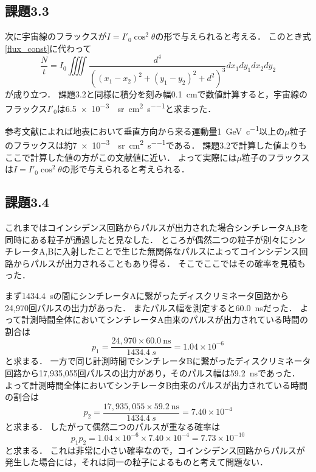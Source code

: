 \documentclass[a4paper,11pt]{jsarticle}
\begin{document}
\subsection{課題3.3}
次に宇宙線のフラックスが$I=I'_0\cos^2{\theta}$の形で与えられると考える．
このとき式\eqref{flux_const}に代わって
\begin{equation}
  \frac{N}{t} = I_0 \iiiint \frac{d^4}{\left((x_1 - x_2)^2 + (y_1 - y_2)^2 + d^2 \right)^{3}} dx_1dy_1dx_2dy_2
\end{equation}
が成り立つ．
課題3.2と同様に積分を刻み幅\SI{0.1}{\cm}で数値計算すると，宇宙線のフラックス$I'_0$は\SI{6.5e-3}{\per\steradian\per\cm^2\per\s}と求まった．

参考文献\cite{cosmray}によれば地表において垂直方向から来る運動量\SI{1}{\GeV \per c}以上の$\mu$粒子のフラックスは約\SI{7e-3}{\per\steradian\per\cm^2\per\s}である．
課題3.2で計算した値よりもここで計算した値の方がこの文献値に近い．
よって実際には$\mu$粒子のフラックスは$I=I'_0\cos^2{\theta}$の形で与えられると考えられる．

\subsection{課題3.4}
これまではコインシデンス回路からパルスが出力された場合シンチレータA,Bを同時にある粒子が通過したと見なした．
ところが偶然二つの粒子が別々にシンチレータA,Bに入射したことで生じた無関係なパルスによってコインシデンス回路からパルスが出力されることもあり得る．
そこでここではその確率を見積もった．

まず\SI{1434.4}{s}の間にシンチレータAに繋がったディスクリミネータ回路から24,970回パルスの出力があった．
またパルス幅を測定すると\SI{60.0}{\ns}だった．
よって計測時間全体においてシンチレータA由来のパルスが出力されている時間の割合は
\begin{equation}
  p_1 = \frac{24,970\times\SI{60.0}{\ns}}{\SI{1434.4}{s}} = 1.04\times 10^{-6}
\end{equation}
と求まる．
一方で同じ計測時間でシンチレータBに繋がったディスクリミネータ回路から17,935,055回パルスの出力があり，そのパルス幅は\SI{59.2}{\ns}であった．
よって計測時間全体においてシンチレータB由来のパルスが出力されている時間の割合は
\begin{equation}
  p_2 = \frac{17,935,055\times\SI{59.2}{\ns}}{\SI{1434.4}{s}} = 7.40\times 10^{-4}
\end{equation}
と求まる．
したがって偶然二つのパルスが重なる確率は
\begin{equation}
  p_1 p_2 = 1.04\times 10^{-6} \times 7.40 \times 10^{-4} = 7.73 \times 10^{-10}
\end{equation}
と求まる．
これは非常に小さい確率なので，コインシデンス回路からパルスが発生した場合には，それは同一の粒子によるものと考えて問題ない．
\end{document}

